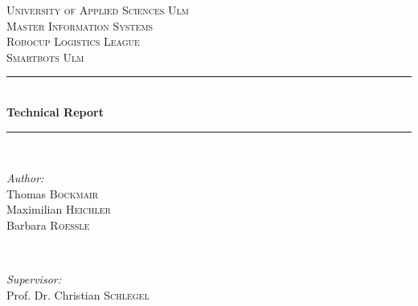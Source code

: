 \documentclass[12pt]{report}
\begin{document}
\begin{titlepage}

\newcommand{\HRule}{\rule{\linewidth}{0.5mm}} %

\center %


\textsc{\LARGE University of Applied Sciences Ulm}\\[1.5cm] %
\textsc{\Large Master Information Systems}\\[0.5cm] 
\textsc{\Large Robocup Logistics League}\\[0.5cm] %
\textsc{\large Smartbots Ulm}\\[0.5cm] %


\HRule \\[0.4cm]
{ \huge \bfseries Technical Report}\\[0.4cm] %
\HRule \\[1.5cm]


\begin{minipage}{0.4\textwidth}
\begin{flushleft} \large
\emph{Author:}\\
Thomas \textsc{Bockmair} \\%
Maximilian \textsc{Heichler} \\%
Barbara \textsc{Roessle} \\%
\end{flushleft}
\end{minipage}
~
\begin{minipage}{0.5\textwidth}
\begin{flushright} \large
\emph{Supervisor:} \\
Prof. Dr. Christian \textsc{Schlegel} %
\end{flushright}
\end{minipage}\\[2cm]


\end{titlepage}
\end{document}
